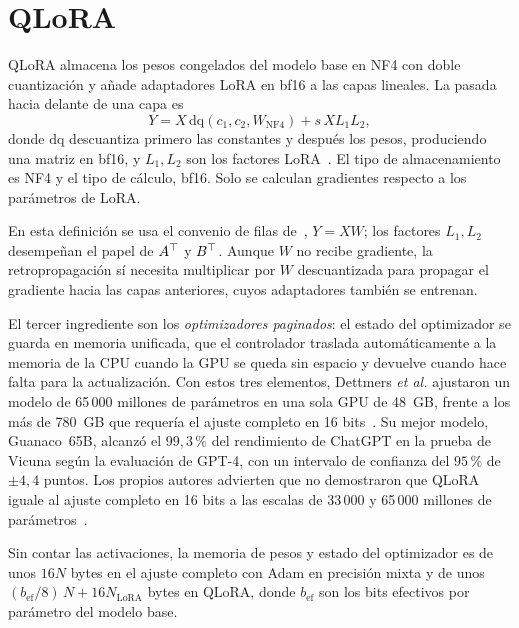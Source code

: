 \section{QLoRA}

\begin{definicion}[QLoRA]\label{def:qlora}
QLoRA almacena los pesos congelados del modelo base en NF4 con doble cuantización y añade adaptadores LoRA en bf16 a las capas lineales. La pasada hacia delante de una capa es
\[
Y=X\,\mathrm{dq}(c_1,c_2,W_{\mathrm{NF4}})+s\,X L_1L_2,
\]
donde $\mathrm{dq}$ descuantiza primero las constantes y después los pesos, produciendo una matriz en bf16, y $L_1,L_2$ son los factores LoRA~\cite[§3, ecs.~5 y~6]{dettmers}. El tipo de almacenamiento es NF4 y el tipo de cálculo, bf16. Solo se calculan gradientes respecto a los parámetros de LoRA.
\end{definicion}

En esta definición se usa el convenio de filas de~\cite{dettmers}, $Y=XW$; los factores $L_1,L_2$ desempeñan el papel de $A^{\top}$ y $B^{\top}$. Aunque $W$ no recibe gradiente, la retropropagación sí necesita multiplicar por $W$ descuantizada para propagar el gradiente hacia las capas anteriores, cuyos adaptadores también se entrenan.

El tercer ingrediente son los \emph{optimizadores paginados}: el estado del optimizador se guarda en memoria unificada, que el controlador traslada automáticamente a la memoria de la CPU cuando la GPU se queda sin espacio y devuelve cuando hace falta para la actualización. Con estos tres elementos, Dettmers \emph{et al.} ajustaron un modelo de 65\,000 millones de parámetros en una sola GPU de 48~GB, frente a los más de 780~GB que requería el ajuste completo en 16 bits~\cite[§1]{dettmers}. Su mejor modelo, Guanaco~65B, alcanzó el $99{,}3\,\%$ del rendimiento de ChatGPT en la prueba de Vicuna según la evaluación de GPT-4, con un intervalo de confianza del $95\,\%$ de $\pm 4{,}4$ puntos. Los propios autores advierten que no demostraron que QLoRA iguale al ajuste completo en 16 bits a las escalas de 33\,000 y 65\,000 millones de parámetros~\cite[§8]{dettmers}.

\begin{proposicion}\label{prop:mem-qlora}
Sin contar las activaciones, la memoria de pesos y estado del optimizador es de unos $16N$ bytes en el ajuste completo con Adam en precisión mixta y de unos $(b_{\mathrm{ef}}/8)\,N+16N_{\mathrm{LoRA}}$ bytes en QLoRA, donde $b_{\mathrm{ef}}$ son los bits efectivos por parámetro del modelo base.
\end{proposicion}

